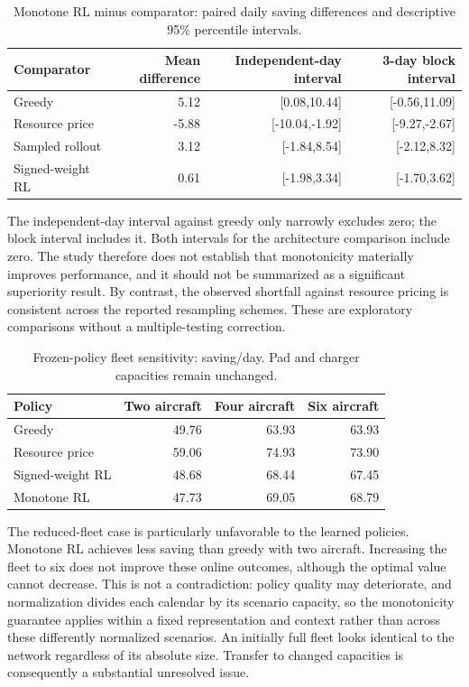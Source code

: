 \documentclass[11pt,a4paper]{article}
\begin{document}
\begin{table}[ht]
\centering\caption{Monotone RL minus comparator: paired daily saving differences and descriptive 95\% percentile intervals.}
\begin{tabular}{lrrr}\toprule
Comparator&Mean difference&Independent-day interval&3-day block interval\\\midrule
Greedy&5.12&[0.08,10.44]&[-0.56,11.09]\\
Resource price&-5.88&[-10.04,-1.92]&[-9.27,-2.67]\\
Sampled rollout&3.12&[-1.84,8.54]&[-2.12,8.32]\\
Signed-weight RL&0.61&[-1.98,3.34]&[-1.70,3.62]\\\bottomrule
\end{tabular}
\end{table}

The independent-day interval against greedy only narrowly excludes zero; the block interval includes it. Both intervals for the architecture comparison include zero. The study therefore does not establish that monotonicity materially improves performance, and it should not be summarized as a significant superiority result. By contrast, the observed shortfall against resource pricing is consistent across the reported resampling schemes. These are exploratory comparisons without a multiple-testing correction.

\begin{table}[ht]
\centering\caption{Frozen-policy fleet sensitivity: saving/day. Pad and charger capacities remain unchanged.}
\begin{tabular}{lrrr}\toprule
Policy&Two aircraft&Four aircraft&Six aircraft\\\midrule
Greedy&49.76&63.93&63.93\\
Resource price&59.06&74.93&73.90\\
Signed-weight RL&48.68&68.44&67.45\\
Monotone RL&47.73&69.05&68.79\\\bottomrule
\end{tabular}
\end{table}

The reduced-fleet case is particularly unfavorable to the learned policies. Monotone RL achieves less saving than greedy with two aircraft. Increasing the fleet to six does not improve these online outcomes, although the optimal value cannot decrease. This is not a contradiction: policy quality may deteriorate, and normalization divides each calendar by its scenario capacity, so the monotonicity guarantee applies within a fixed representation and context rather than across these differently normalized scenarios. An initially full fleet looks identical to the network regardless of its absolute size. Transfer to changed capacities is consequently a substantial unresolved issue.
\end{document}
